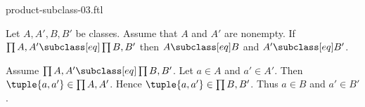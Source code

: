 \documentclass{article}
\begin{document}
\begin{smodule}[creators={Marcel Schütz}]{product-subclass-03.ftl}

  \begin{fproposition*}[label=6567035653849088]
    Let $A, A', B, B'$ be classes.
    Assume that $A$ and $A'$ are nonempty.
    If $\prod{A,A'} \subclass[eq] \prod{B,B'}$ then $A \subclass[eq] B$ and $A' \subclass[eq] B'$.
  \end{fproposition*}
  \begin{fproof}
    Assume $\prod{A,A'} \subclass[eq] \prod{B,B'}$.
    Let $a \in A$ and $a' \in A'$.
    Then $\tuple{a,a'} \in \prod{A,A'}$.
    Hence $\tuple{a,a'} \in \prod{B,B'}$.
    Thus $a \in B$ and $a' \in B'$.
  \end{fproof}
\end{smodule}
\end{document}
